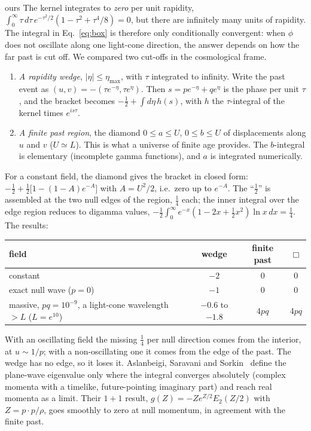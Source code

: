 \documentclass[11pt,a4paper]{article}
\newcommand{\tagbox}[2]{\textsf{\scriptsize\colorbox{#1!12}{\textcolor{#1!70!black}{#2}}}}
\newcommand{\ours}{\tagbox{orange}{ours}}
\begin{document}
\ours{} The kernel integrates to \emph{zero} per unit rapidity, $\int_0^\infty\tau\,d\tau\,e^{-\tau^2/2}(1-\tau^2+\tau^4/8)=0$, but there are infinitely many units of rapidity. The integral in Eq.~\eqref{eq:box} is therefore only conditionally convergent: when $\phi$ does not oscillate along one light-cone direction, the answer depends on how the far past is cut off. We compared two cut-offs in the cosmological frame.
\begin{enumerate}[leftmargin=*,itemsep=1pt]
\item \emph{A rapidity wedge}, $|\eta|\le\eta_{\max}$, with $\tau$ integrated to infinity. Write the past event as $(u,v)=-(\tau e^{-\eta},\tau e^{\eta})$. Then $s=pe^{-\eta}+qe^{\eta}$ is the phase per unit $\tau$, and the bracket becomes $-\tfrac12+\int d\eta\,h(s)$, with $h$ the $\tau$-integral of the kernel times $e^{is\tau}$.
\item \emph{A finite past region}, the diamond $0\le a\le U$, $0\le b\le U$ of displacements along $u$ and $v$ ($U\simeq L$). This is what a universe of finite age provides. The $b$-integral is elementary (incomplete gamma functions), and $a$ is integrated numerically.
\end{enumerate}
For a constant field, the diamond gives the bracket in closed form: $-\tfrac12+\tfrac12\big[1-(1-A)e^{-A}\big]$ with $A=U^2/2$, i.e.\ zero up to $e^{-A}$. The ``$\tfrac12$'' is assembled at the two null edges of the region, $\tfrac14$ each; the inner integral over the edge region reduces to digamma values, $-\tfrac12\int_0^\infty e^{-x}(1-2x+\tfrac12x^2)\ln x\,dx=\tfrac14$. The results:
\begin{center}\small
\begin{tabular}{@{}lccc@{}}
\toprule
field & wedge & finite past & $\Box$\\
\midrule
constant & $-2$ & $0$ & $0$\\
exact null wave ($p=0$) & $-1$ & $0$ & $0$\\
massive, $pq=10^{-9}$, a light-cone wavelength $>L$ ($L=e^{10}$) & $-0.6$ to $-1.8$ & $4pq$ & $4pq$\\
\bottomrule
\end{tabular}
\end{center}
With an oscillating field the missing $\tfrac14$ per null direction comes from the interior, at $u\sim1/p$; with a non-oscillating one it comes from the edge of the past. The wedge has no edge, so it loses it. Aslanbeigi, Saravani and Sorkin~\cite{ASS14} define the plane-wave eigenvalue only where the integral converges absolutely (complex momenta with a timelike, future-pointing imaginary part) and reach real momenta as a limit. Their $1+1$ result, $g(Z)=-Ze^{Z/2}E_2(Z/2)$ with $Z=p\cdot p/\rho$, goes smoothly to zero at null momentum, in agreement with the finite past.
\end{document}
